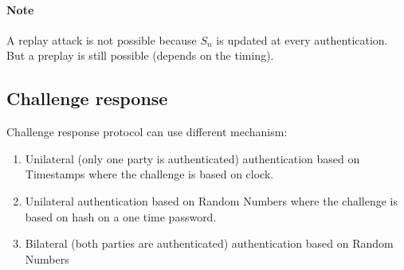 \paragraph{Note} A replay attack is not possible because $S_n$ is
updated at every authentication. But a preplay is still possible (depends on the
timing).

\subsection{Challenge response}
Challenge response protocol can use different mechanism:

\begin{enumerate}
    \item Unilateral (only one party is authenticated) authentication
        based on Timestamps where the challenge is based on clock.
    \item Unilateral authentication based on Random Numbers where the
        challenge is based on hash on a
        one time password.
    \item Bilateral (both parties are authenticated) authentication based on Random Numbers
\end{enumerate}

